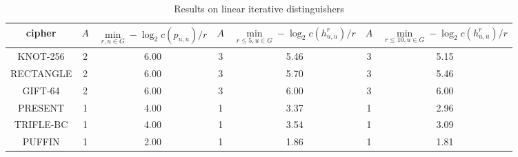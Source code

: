 \begin{table}
	\caption{Results on linear iterative distinguishers}\label{tab:ite-lat2}
	\centering
	\begin{tabular}{|c||c|c||c|c||c|c|}
		\hline
		cipher & $A$ & \tiny$\min\limits_{r,u\in G}-\log_2c(p_{u,u})/r$ & $A$ & \tiny$\min\limits_{r\leq 5,u\in G}-\log_2c(h^r_{u,u})/r$ & $A$ & \tiny$\min\limits_{r\leq 10,u\in G}-\log_2c(h^r_{u,u})/r$ \\
		\hline
		KNOT-256 & 2 & 6.00 & 3 & 5.46 & 3 & 5.15 \\
		\hline
		RECTANGLE & 2 & 6.00 & 3 & 5.70 & 3 & 5.46 \\
		\hline
		GIFT-64 & 2 & 6.00 & 3 & 6.00 & 3 & 6.00 \\
		\hline
		PRESENT & 1 & 4.00 & 1 & 3.37 & 1 & 2.96 \\
		\hline
		TRIFLE-BC & 1 & 4.00 & 1 & 3.54 & 1 & 3.09 \\
		\hline
		PUFFIN & 1 & 2.00 & 1 & 1.86 & 1 & 1.81 \\
		\hline
	\end{tabular}
\end{table}




